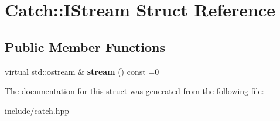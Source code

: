 \hypertarget{structCatch_1_1IStream}{}\section{Catch\+:\+:I\+Stream Struct Reference}
\label{structCatch_1_1IStream}
\subsection*{Public Member Functions}
\begin{DoxyCompactItemize}
\item 
virtual std\+::ostream \& {\bfseries stream} () const =0\hypertarget{structCatch_1_1IStream_a55a9ddbe250261ff38642f480ebdd902}{}\label{structCatch_1_1IStream_a55a9ddbe250261ff38642f480ebdd902}

\end{DoxyCompactItemize}


The documentation for this struct was generated from the following file\+:\begin{DoxyCompactItemize}
\item 
include/catch.\+hpp\end{DoxyCompactItemize}
